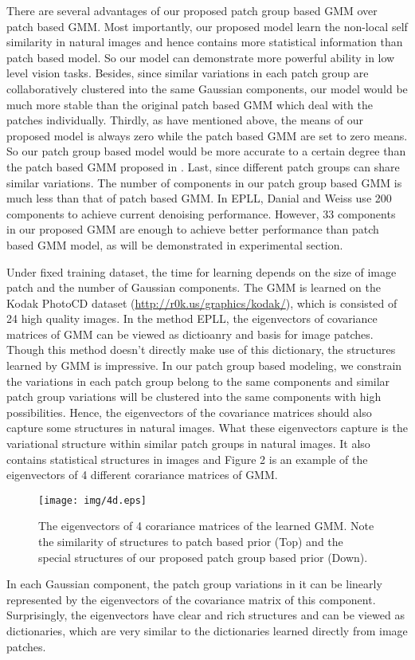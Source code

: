 \documentclass[10pt,twocolumn,letterpaper]{article}
\begin{document}
There are several advantages of our proposed patch group based GMM over patch based GMM. Most importantly, our proposed model learn the non-local self similarity in natural images and hence contains more statistical information than patch based model. So our model can demonstrate more powerful ability in low level vision tasks. Besides, since similar variations in each patch group are collaboratively clustered into the same Gaussian components, our model would be much more stable than the original patch based GMM which deal with the patches individually. Thirdly, as have mentioned above, the means of our proposed model is always zero while the patch based GMM \cite{epll} are set to zero means. So our patch group based model would be more accurate to a certain degree than the patch based GMM proposed in \cite{epll}. Last, since different patch groups can share similar variations. The number of components in our patch group based GMM is much less than that of patch based GMM. In EPLL\cite{epll}, Danial and Weiss use 200 components to achieve current denoising performance. However, 33 components in our proposed GMM are enough to achieve better performance than patch based GMM model\cite{epll}, as will be demonstrated in experimental section.

Under fixed training dataset, the time for learning depends on the size of image patch and the number of Gaussian components. The GMM is learned on the Kodak PhotoCD dataset (\url{http://r0k.us/graphics/kodak/}), which is consisted of 24 high quality images. In the method EPLL\cite{epll}, the eigenvectors of covariance matrices of GMM can be viewed as dictioanry and basis for image patches. Though this method doesn't directly make use of this dictionary, the structures learned by GMM is impressive. In our patch group based modeling, we constrain the variations in each patch group belong to the same components and similar patch group variations will be clustered into the same components with high possibilities. Hence, the eigenvectors of the covariance matrices should also capture some structures in natural images. What these eigenvectors capture is the variational structure within similar patch groups in natural images. It also contains statistical structures in images and Figure 2 is an example of the eigenvectors of 4 different corariance matrices of GMM. 
\begin{figure}[t]
\begin{center}
   \texttt{[image: img/4d.eps]}
\end{center}
\caption{The eigenvectors of 4 corariance matrices of the learned GMM. Note the similarity of structures to patch based prior (Top) and the special structures of our proposed patch group based prior (Down).}
\end{figure}
In each Gaussian component, the patch group variations in it can be linearly represented by the eigenvectors of the covariance matrix of this component\cite{epll}. Surprisingly, the eigenvectors have clear and rich structures and can be viewed as dictionaries, which are very similar to the dictionaries learned directly from image patches\cite{epll}.
\end{document}
